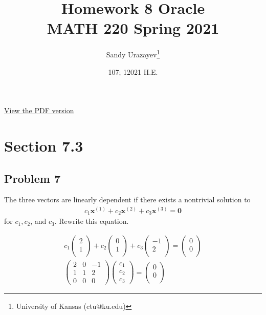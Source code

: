 \documentclass[12pt]{article}
\author{Sandy Urazayev\thanks{University of Kansas (ctu@ku.edu)}}
\date{107; 12021 H.E.}
\title{Homework 8 Oracle\\\medskip
\large MATH 220 Spring 2021}
\begin{document}
\maketitle
\href{./index.pdf}{View the PDF version​}

\section*{Section 7.3}
\label{sec:orgae56529}
\subsection*{Problem 7}
\label{sec:orgc2376a2}
   The three vectors are linearly dependent if there exists a nontrivial solution to
\begin{align*}
c_{1} \mathbf{x}^{(1)}+c_{2} \mathbf{x}^{(2)}+c_{3} \mathbf{x}^{(3)}=\mathbf{0}
\end{align*}
for \(c_{1}, c_{2}\), and \(c_{3}\). Rewrite this equation.

\begin{equation*}
	\begin{array}{l}
		c_{1}\left(\begin{array}{l}
				2 \\
				1 \\

			\end{array}\right)+c_{2}\left(\begin{array}{l}
				0 \\
				1 \\

			\end{array}\right)+c_{3}\left(\begin{array}{r}
				-1 \\
				2  \\

			\end{array}\right)=\left(\begin{array}{l}
				0 \\
				0 \\

			\end{array}\right) \\
		\left(\begin{array}{llr}
				2 & 0 & -1 \\
				1 & 1 & 2  \\
				0 & 0 & 0
			\end{array}\right)\left(\begin{array}{l}
				c_{1} \\
				c_{2} \\
				c_{3}
			\end{array}\right)=\left(\begin{array}{l}
				0 \\
				0 \\

			\end{array}\right)
	\end{array}
\end{equation*}
\end{document}
